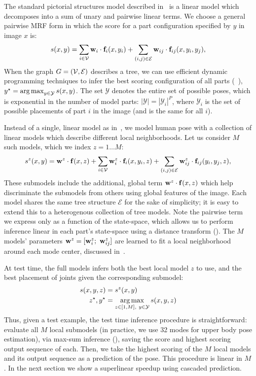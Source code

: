 The standard pictorial structures model described in~ is a linear 
model which decomposes into a sum of unary and pairwise linear terms.  We 
choose a general pairwise MRF form in which the score for a part configuration 
specified by $y$ in image $x$ is:
\begin{align}
 s(x,y) = \sum_{i \in \mathcal{V}} \mathbf{w}_i \cdot \mathbf{f}_i(x,y_i) + \sum_{(i,j) \in \mathcal{E}} 
\mathbf{w}_{ij} \cdot \mathbf{f}_{ij}(x,y_i,y_j),
 \label{eq:llps-ps}
\end{align}
When the graph $G = (\mathcal{V},\mathcal{E})$ describes a tree, we can use efficient dynamic 
programming techniques to infer the best scoring configuration of all parts 
(~), $y^\star = \mathop{\arg\max}_{y \in \mathcal{Y}} s(x,y)$.
The set $\mathcal{Y}$ denotes the entire set of possible poses, which is 
exponential in the number of model parts: $|\mathcal{Y}| = |\mathcal{Y}_i|^P$, 
where $\mathcal{Y}_i$ is the set of possible placements of part $i$ in the 
image (and is the same for all $i$).

Instead of a single, linear model as in~, we model human pose 
with a collection of linear models which describe different local 
neighborhoods.  Let us consider $M$ such models, which we index $z = 1 \ldots 
M$:
\begin{align}
s^z(x,y) = \mathbf{w}^z \cdot \mathbf{f}(x,z) +  \sum_{i \in \mathcal{V}} \mathbf{w}^z_i \cdot \mathbf{f}_i(x,y_i,z) + 
\sum_{(i,j) \in \mathcal{E}} \mathbf{w}^z_{ij} \cdot \mathbf{f}_{ij}(y_i,y_j,z),
\end{align}
These submodels include the additional, global term $\mathbf{w}^z \cdot \mathbf{f}(x,z)$ which 
help discriminate the submodels from others using global features of the image.  
Each model shares the same tree structure $\mathcal{E}$ for the sake of 
simplicity; it is easy to extend this to a heterogenous collection of tree 
models.  Note the pairwise term we express only as a function of the 
state-space, which allows us to perform inference linear in each part's 
state-space using a distance transform ().  The $M$ models' 
parameters $\mathbf{w}^z = [\mathbf{w}^z_i;~\mathbf{w}^z_{ij}]$ are learned to fit a local neighborhood 
around each mode center, discussed in~.

At test time, the full \LLPS models infers both the best local model $z$ to 
use, and the best placement of joints given the corresponding submodel:
\begin{align}
s(x,y,z) &= s^z(x,y) \\
z^\star,y^\star &= \mathop{\arg\max}_{z \in [1,M],~y \in \mathcal{Y}} s(x,y,z) 
\end{align}
Thus, given a test example, the test time inference procedure is 
straightforward: evaluate all $M$ local submodels (in practice, we use 32 modes 
for upper body pose estimation), via max-sum inference (), 
saving the score and highest scoring output sequence of each.  Then, we take 
the highest scoring of the $M$ local models and its output sequence as a 
prediction of the pose.  This procedure is linear in $M$.  In the next section 
we show a superlinear speedup using cascaded prediction.

